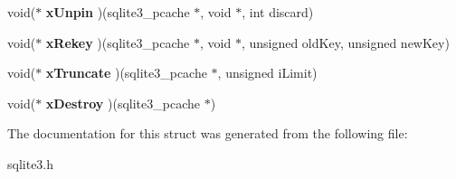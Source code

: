 \begin{DoxyCompactItemize}
void($\ast$ {\bfseries x\+Unpin} )(sqlite3\+\_\+pcache $\ast$, void $\ast$, int discard)
\item 
\mbox{\label{structsqlite3__pcache__methods_a0d8a7a980e22e908429a181f8fc7733e}} 
void($\ast$ {\bfseries x\+Rekey} )(sqlite3\+\_\+pcache $\ast$, void $\ast$, unsigned old\+Key, unsigned new\+Key)
\item 
\mbox{\label{structsqlite3__pcache__methods_adc097defb1e83c6442fc0d47ac79cec9}} 
void($\ast$ {\bfseries x\+Truncate} )(sqlite3\+\_\+pcache $\ast$, unsigned i\+Limit)
\item 
\mbox{\label{structsqlite3__pcache__methods_ac775533f86db1d15bf7e4ded0e037eaf}} 
void($\ast$ {\bfseries x\+Destroy} )(sqlite3\+\_\+pcache $\ast$)
\end{DoxyCompactItemize}


The documentation for this struct was generated from the following file\+:\begin{DoxyCompactItemize}
\item 
sqlite3.\+h\end{DoxyCompactItemize}
